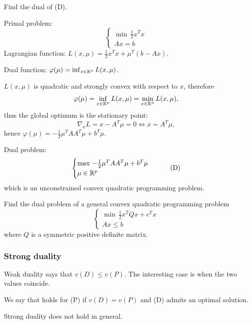  Find the dual of (D).

\begin{example}
    Primal problem:
    \[
        \begin{cases}
            \min\, \frac{1}{2}x^Tx\\
            Ax = b
        \end{cases} \tag{P}
    \]
    Lagrangian function: $L(x, \mu) = \frac{1}{2}x^Tx + \mu^T(b - Ax)$.

    Dual function: $\varphi(\mu) = \inf_{x \in \mathbb{R}^n} L(x, \mu)$.

    $L(x, \mu)$ is quadratic and strongly convex with respect to $x$, therefore
    \[
        \varphi(\mu) = \inf_{x \in \mathbb{R}^n} L(x, \mu) = \min_{x \in \mathbb{R}^n} L(x, \mu),
    \]
    thus the global optimum is the stationary point:
    \[
        \nabla_x L = x - A^T\mu = 0 \iff x = A^T\mu,
    \]
    hence $\varphi(\mu) = -\frac{1}{2}\mu^TAA^T\mu + b^T\mu$.

    Dual problem:
    \[
        \begin{cases}
            \max\, -\frac{1}{2}\mu^TAA^T\mu + b^T\mu\\
            \mu \in \mathbb{R}^p
        \end{cases} \tag{D}
    \]
    which is an unconstrained convex quadratic programming problem.
\end{example}

 Find the dual problem of a general convex quadratic programming problem
\[
    \begin{cases}
        \min\, \frac{1}{2}x^TQx + c^Tx\\
        Ax \le b
    \end{cases} \tag{P}
\]
where $Q$ is a symmetric positive definite matrix.

\subsubsection{Strong duality}

Weak duality says that $v(D) \le v(P)$. The interesting case is when the two values coincide.

\begin{definition}
    We say that  holds for (P) if $v(D) = v(P)$ and (D) admits an optimal solution.
\end{definition}

Strong duality does not hold in general.

